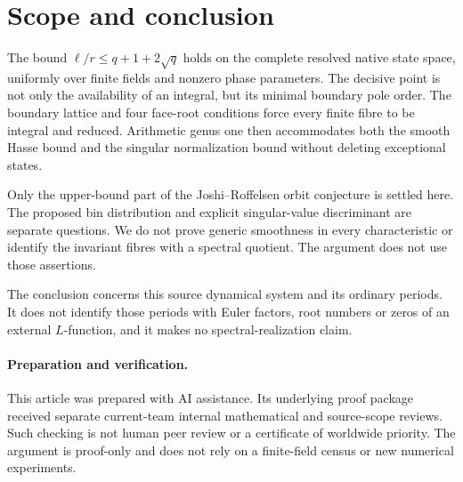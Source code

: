 \section{Scope and conclusion}\label{sec:conclusion}

The bound \(\ell/r\le q+1+2\sqrt q\) holds on the complete
resolved native state space, uniformly over finite fields and nonzero
phase parameters. The decisive point is not only the availability of
an integral, but its minimal boundary pole order. The boundary lattice
and four face-root conditions force every finite fibre to be integral
and reduced. Arithmetic genus one then accommodates both the smooth
Hasse bound and the singular normalization bound without deleting
exceptional states.

Only the upper-bound part of the Joshi--Roffelsen orbit conjecture is
settled here. The proposed bin distribution and explicit singular-value
discriminant are separate questions. We do not prove generic smoothness
in every characteristic or identify the invariant fibres with a
spectral quotient. The argument does not use those assertions.

The conclusion concerns this source dynamical system and its ordinary
periods. It does not identify those periods with Euler factors, root
numbers or zeros of an external \(L\)-function, and it makes no
spectral-realization claim.

\paragraph{Preparation and verification.}
This article was prepared with AI assistance. Its underlying proof
package received separate current-team internal mathematical and
source-scope reviews. Such checking is not human peer review or a
certificate of worldwide priority. The argument is proof-only and
does not rely on a finite-field census or new numerical experiments.
